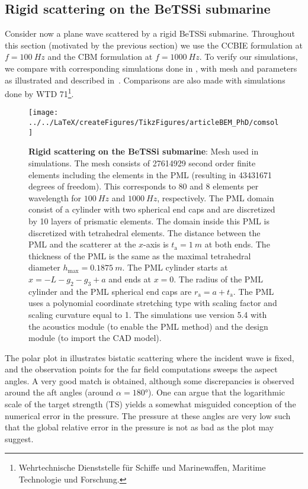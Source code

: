 \subsection{Rigid scattering on the BeTSSi submarine}
Consider now a plane wave scattered by a rigid BeTSSi submarine. Throughout this section (motivated by the previous section) we use the CCBIE formulation at $f=\SI{100}{Hz}$ and the CBM formulation at $f=\SI{1000}{Hz}$. To verify our simulations, we compare with corresponding simulations done in \COMSOL, with mesh and parameters as illustrated and described in~. Comparisons are also made with simulations done by WTD 71\footnote{Wehrtechnische Dienststelle f\"{u}r Schiffe und Marinewaffen, Maritime Technologie und Forschung.}.
\begin{figure}
	\centering
	\texttt{[image: ../../LaTeX/createFigures/TikzFigures/articleBEM\_PhD/comsol]}
	\caption{\textbf{Rigid scattering on the BeTSSi submarine}: Mesh used in \COMSOL simulations. The mesh consists of \num{27614929} second order finite elements including the elements in the PML (resulting in \num{43431671} degrees of freedom). This corresponds to 80 and 8 elements per wavelength for $\SI{100}{Hz}$ and $\SI{1000}{Hz}$, respectively.  The PML domain consist of a cylinder with two spherical end caps and are discretized by 10 layers of prismatic elements. The domain inside this PML is discretized with tetrahedral elements. The distance between the PML and the scatterer at the $x$-axis is $t_{\mathrm{a}}=\SI{1}{m}$ at both ends. The thickness of the PML is the same as the maximal tetrahedral diameter $h_{\mathrm{max}}=\SI{0.1875}{m}$. The PML cylinder starts at $x=-L-g_2-g_3+a$ and ends at $x=0$. The radius of the PML cylinder and the PML spherical end caps are $r_{\mathrm{a}} = a+t_{\mathrm{a}}$. The PML uses a polynomial coordinate stretching type with scaling factor and scaling curvature equal to 1. The simulations use \COMSOL version 5.4 with the acoustics module (to enable the PML method) and the design module (to import the CAD model).}
	\label{Fig3:COMSOL}
\end{figure}
The polar plot in  illustrates bistatic scattering where the incident wave is fixed, and the observation points for the far field computations sweeps the aspect angles. A very good match is obtained, although some discrepancies is observed around the aft angles (around $\alpha=\ang{180}$). One can argue that the logarithmic scale of the target strength (TS) yields a somewhat misguided conception of the numerical error in the pressure. The pressure at these angles are very low such that the global relative error in the pressure is not as bad as the plot may suggest.
